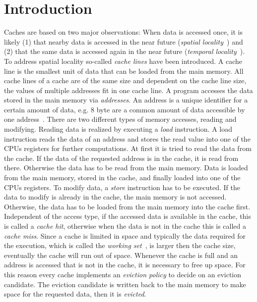 \documentclass[onecolumn, openright, master, english, signatures]{dbrgrptt}
\begin{document}
\chapter{Introduction}\label{cha:introduction}
Caches are based on two major observations: When data is accessed once, it is likely (1) that nearby data is accessed in the near future (\emph{spatial locality}~\cite{jacob2010memory}) and (2) that the same data is accessed again in the near future (\emph{temporal locality}~\cite{jacob2010memory}).
To address spatial locality so-called \emph{cache lines} have been introduced.
A cache line is the smallest unit of data that can be loaded from the main memory.
All cache lines of a cache are of the same size and dependent on the cache line size, the values of multiple addresses fit in one cache line.
A program accesses the data stored in the main memory via \emph{addresses}.
An address is a unique identifier for a certain amount of data, e.g. 8 byte are a common amount of data accessible by one address~\cite{patterson2011computer}.
%
There are two different types of memory accesses, reading and modifying.
Reading data is realized by executing a \emph{load} instruction.
A load instruction reads the data of an address and stores the read value into one of the \ac{CPU}s registers for further computations.
At first it is tried to read the data from the cache.
If the data of the requested address is in the cache, it is read from there.
Otherwise the data has to be read from the main memory.
Data is loaded from the main memory, stored in the cache, and finally loaded into one of the \ac{CPU}s registers.
To modify data, a \emph{store} instruction has to be executed.
If the data to modify is already in the cache, the main memory is not accessed.
Otherwise, the data has to be loaded from the main memory into the cache first.
Independent of the access type, if the accessed data is available in the cache, this is called a \emph{cache hit}, otherwise when the data is not in the cache this is called a \emph{cache miss}.
%
Since a cache is limited in space and typically the data required for the execution, which is called the \emph{working set}~\cite{denning1968working}, is larger then the cache size, eventually the cache will run out of space.
Whenever the cache is full and an address is accessed that is not in the cache, it is necessary to free up space.
For this reason every cache implements an \emph{eviction policy} to decide on an eviction candidate.
The eviction candidate is written back to the main memory to make space for the requested data, then it is \emph{evicted}.
\end{document}
